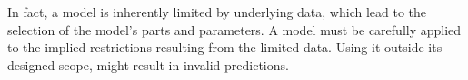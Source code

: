 
In fact, a model is inherently limited by underlying data, which lead to the selection of the model's parts and parameters.
A model must be carefully applied to the implied restrictions resulting from the limited data.
Using it outside its designed scope, might result in invalid predictions.

